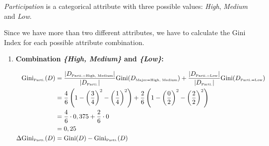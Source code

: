 \documentclass[
english,
smallborders
]{i6prcsht}
\newcommand{\OfSpecificValue}[3]{_{\text{\tiny #1#2#3}}}
\newcommand{\OfAttribute}[1]{_{\text{\tiny #1}}}
\begin{document}
\begin{solution}
\begin{enumerate}
\begin{enumerate}
\begin{enumerate}
				                  \textit{Participation} is a categorical attribute with three possible values: \textit{High}, \textit{Medium} and \textit{Low}.
				                  
				                  Since we have more than two different attributes, we have to calculate the Gini Index for each possible attribute combination.
				                  
				                  \begin{enumerate}
					                  \item \textbf{Combination \textit{\{High, Medium\}} and \textit{\{Low\}}:}
					                        
					                        \begin{alignat*}{2}
						                        \text{Gini}\OfAttribute{Parti.}(D)       & = \frac{|D\OfSpecificValue{Parti.}{=}{High, Medium}|}{|D\OfAttribute{Parti.}|} \text{Gini}(D\OfSpecificValue{Major}{=}{High, Medium}) + \frac{|D\OfSpecificValue{Parti.}{=}{Low}|}{|D\OfAttribute{Parti.}|} \text{Gini}(D\OfSpecificValue{Parti.}{=}{Low}) \\
						                                                                 & = \frac{4}{6} \left(1 - \left(\frac{3}{4}\right)^2 - \left(\frac{1}{4}\right)^2\right) + \frac{2}{6} \left(1 - \left(\frac{0}{2}\right)^2 - \left(\frac{2}{2}\right)^2\right)                                                                              \\
						                                                                 & = \frac{4}{6} \cdot 0,375 + \frac{2}{6} \cdot 0                                                                                                                                                                                                            \\
						                                                                 & = 0,25                                                                                                                                                                                                                                                     \\
						                        \Delta\text{Gini}\OfAttribute{Parti.}(D) & = \text{Gini}(D) - \text{Gini}\OfAttribute{Parti.}(D)                                                                                                                                                                                                      \\

\end{alignat*}
\end{enumerate}
\end{enumerate}
\end{enumerate}
\end{enumerate}
\end{solution}
\end{document}
